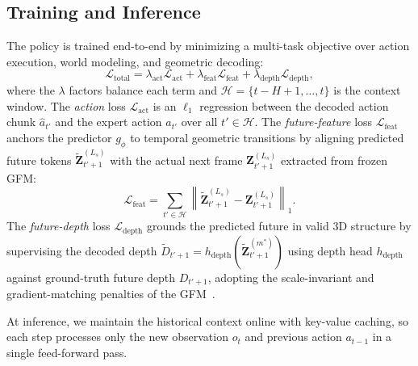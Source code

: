 \subsection{Training and Inference}
\label{sec:method:training}
The policy is trained end-to-end by minimizing a multi-task objective over action execution, world modeling, and geometric decoding:
\begin{equation}
    \mathcal{L}_{\text{total}} = \lambda_{\text{act}} \mathcal{L}_{\text{act}} + \lambda_{\text{feat}} \mathcal{L}_{\text{feat}} + \lambda_{\text{depth}} \mathcal{L}_{\text{depth}},
\end{equation}
where the $\lambda$ factors balance each term and $\mathcal{H} = \{t-H+1, \ldots, t\}$ is the context window. The \emph{action} loss $\mathcal{L}_{\text{act}}$ is an $\ell_1$ regression between the decoded action chunk $\hat a_{t'}$ and the expert action $a_{t'}$ over all $t' \in \mathcal{H}$. The \emph{future-feature} loss $\mathcal{L}_{\text{feat}}$ anchors the predictor $g_\phi$ to temporal geometric transitions by aligning predicted future tokens $\tilde{\mathbf{Z}}_{t'+1}^{(L_s)}$ with the actual next frame $\mathbf{Z}_{t'+1}^{(L_s)}$ extracted from frozen GFM:
\begin{equation}
    \mathcal{L}_{\text{feat}} = \sum_{t' \in \mathcal{H}} \left\| \tilde{\mathbf{Z}}_{t'+1}^{(L_s)} - \mathbf{Z}_{t'+1}^{(L_s)} \right\|_1.
\end{equation}
The \emph{future-depth} loss $\mathcal{L}_{\text{depth}}$ grounds the predicted future in valid 3D structure by supervising the decoded depth $\tilde{D}_{t'+1}=h_{\text{depth}}(\tilde{\mathbf{Z}}_{t'+1}^{(m^*)})$ using depth head $h_{\text{depth}}$ against ground-truth future depth $D_{t'+1}$, adopting the scale-invariant and gradient-matching penalties of the GFM~\citep{lin2025depth, wang2026vggt}. 

At inference, we maintain the historical context online with key-value caching, so each step processes only the new observation $o_t$ and previous action $a_{t-1}$ in a single feed-forward pass. 